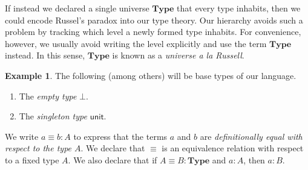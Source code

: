 \documentclass[10pt,letterpaper,cm]{nupset}
\theoremstyle{definition}
\newtheorem{exmp}[definition]{Example}
\theoremstyle{theorem}
\theoremstyle{remark}
\newcommand{\1}{\mathbf{1}}
\newcommand{\0}{\vec 0}
\begin{document}
If instead we declared a single universe $\mathbf{Type}$ that every type inhabits, then we could encode Russel's paradox into our type theory. Our hierarchy avoids such a problem by tracking which level a newly formed type inhabits. For convenience, however, we usually avoid writing the level explicitly and use the term $\mathbf{Type}$ instead. In this sense, $\mathbf{Type}$ is known as a \textit{universe a la Russell}.
\begin{exmp} The following (among others) will be base types of our language.
\begin{enumerate}
\item The \textit{empty type} $\bot$.
\item The \textit{singleton type} $\mathsf{unit}$.
\end{enumerate}
\end{exmp}
We write $a\equiv b :A$ to express that the terms $a$ and $b$ are \textit{definitionally equal with respect to the type $A$}. We declare that $\equiv$ is an equivalence relation with respect to a fixed type $A$. We also declare that if $A\equiv B : \mathbf{Type}$ and $a: A$, then $a:B$.
\end{document}
